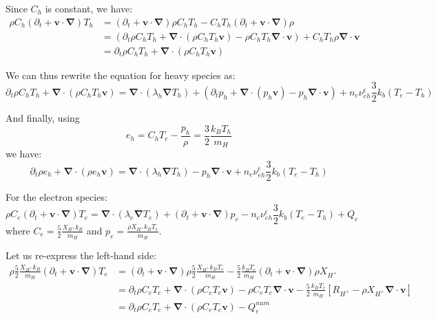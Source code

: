 \documentclass[11pt, oneside]{article}   	%
\begin{document}
Since $C_h$ is constant, we have:
\begin{align*} 
\rho C_h (\partial_t + \boldsymbol{v}\cdot\boldsymbol{\nabla})T_h &=  (\partial_t + \boldsymbol{v}\cdot\boldsymbol{\nabla}) \rho C_h T_h - C_h T_h  (\partial_t + \boldsymbol{v}\cdot\boldsymbol{\nabla})\rho \\
&= (\partial_t \rho C_h T_h + \boldsymbol{\nabla}\cdot(\rho C_h T_h \boldsymbol{v}) - \rho C_h T_h \boldsymbol{\nabla}\cdot\boldsymbol{v} ) + C_hT_h \rho \boldsymbol{\nabla}\cdot\boldsymbol{v} \\ 
& =  \partial_t \rho C_h T_h + \boldsymbol{\nabla}\cdot(\rho C_h T_h \boldsymbol{v})
\end{align*}

We can thus rewrite the equation for heavy species as:
\[ \partial_t \rho C_h T_h + \boldsymbol{\nabla}\cdot(\rho C_h T_h \boldsymbol{v}) = \boldsymbol{\nabla}\cdot(\lambda_h\boldsymbol{\nabla}T_h) + (\partial_t p_h + \boldsymbol{\nabla}\cdot(p_h \boldsymbol{v}) - p_h \boldsymbol{\nabla}\cdot \boldsymbol{v}) + n_e\nu_{eh}^\epsilon \frac{3}{2}k_b(T_e - T_h) \]

And finally, using
\[ e_h = C_h T_e - \frac{p_h}{\rho} = \frac{3}{2}\frac{k_B T_h}{m_H} \]
we have:
\[ \partial_t \rho e_h + \boldsymbol{\nabla}\cdot(\rho e_h \boldsymbol{v}) = \boldsymbol{\nabla}\cdot(\lambda_h\boldsymbol{\nabla}T_h) - p_h \boldsymbol{\nabla}\cdot \boldsymbol{v} + n_e\nu_{eh}^\epsilon \frac{3}{2}k_b(T_e - T_h) \]


For the electron species:
\[ \rho C_e (\partial_t + \boldsymbol{v}\cdot\boldsymbol{\nabla})T_e = \boldsymbol{\nabla}\cdot(\lambda_e\boldsymbol{\nabla}T_e) + (\partial_t + \boldsymbol{v}\cdot\boldsymbol{\nabla})p_e - n_e\nu_{eh}^\epsilon \frac{3}{2}k_b(T_e - T_h) + Q_e\]
where $C_e = \frac{5}{2}\frac{X_{H^+}k_B}{m_H}$ and $p_e = \frac{\rho X_{H^+} k_B T_e}{m_H}$.

Let us re-express the left-hand side:
\begin{align*} 
\rho \frac{5}{2}\frac{X_{H^+}k_B}{m_H} (\partial_t + \boldsymbol{v}\cdot\boldsymbol{\nabla})T_e  &=  (\partial_t + \boldsymbol{v}\cdot\boldsymbol{\nabla}) \rho \frac{5}{2}\frac{X_{H^+}k_B T_e}{m_H} - \frac{5}{2}\frac{k_BT_e}{m_H} (\partial_t + \boldsymbol{v}\cdot\boldsymbol{\nabla}) \rho X_{H^+} \\
&= \partial_t \rho C_e T_e + \boldsymbol{\nabla}\cdot( \rho C_e T_e \boldsymbol{v} ) - \rho C_e T_e\boldsymbol{\nabla}\cdot \boldsymbol{v}  - \frac{5}{2}\frac{k_BT_e}{m_H} \left[ R_{H^+} - \rho X_{H^+}\boldsymbol{\nabla}\cdot\boldsymbol{v}\right] \\
& = \partial_t \rho C_e T_e + \boldsymbol{\nabla}\cdot( \rho C_e T_e \boldsymbol{v} ) - Q_e^{num}
\end{align*}
\end{document}
